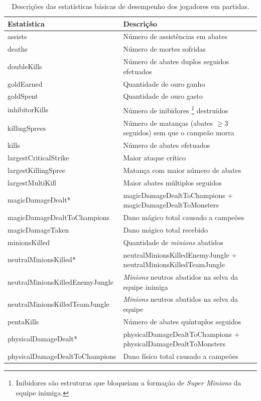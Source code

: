 \begin{table}
  \scriptsize
  \caption{Descrições das estatísticas básicas de desempenho dos jogadores em partidas.}
  \label{tab:features-desc}
  \begin{tabular}{p{}p{}}
    \toprule
    Estatística & Descrição \\
    \midrule
assists & Número de assistências em abates\\
deaths & Número de mortes sofridas \\
doubleKills & Número de abates duplos seguidos efetuados\\
goldEarned & Quantidade de ouro ganho\\
goldSpent & Quantidade de ouro gasto\\
inhibitorKills & Número de inibidores \footnote{Inibidores são estruturas que bloqueiam a formação de \textit{Super Minions} da equipe inimiga.} destruídos\\
killingSprees & Número de matanças (abates $\geq 3$ seguidos) sem que o campeão morra \\
kills & Número de abates efetuados\\
largestCriticalStrike & Maior ataque crítico\\
largestKillingSpree & Matança com maior número de abates\\
largestMultiKill & Maior abates múltiplos seguidos\\
magicDamageDealt* & magicDamageDealtToChampions +  magicDamageDealtToMonsters\\
magicDamageDealtToChampions & Dano mágico total causado a campeões\\
magicDamageTaken & Dano mágico total recebido\\
minionsKilled & Quantidade de \textit{minions} abatidos\\
 neutralMinionsKilled* & neutralMinionsKilledEnemyJungle + neutralMinionsKilledTeamJungle\\
neutralMinionsKilledEnemyJungle & \textit{Minions} neutros abatidos na selva da equipe inimiga
\\
neutralMinionsKilledTeamJungle & \textit{Minions} neutros abatidos na selva da equipe\\
pentaKills & Número de abates quíntuplos seguidos\\
physicalDamageDealt* & physicalDamageDealtToChampions + physicalDamageDealtToMonsters\\
physicalDamageDealtToChampions & Dano físico total causado a campeões\\

\end{tabular}
\end{table}
